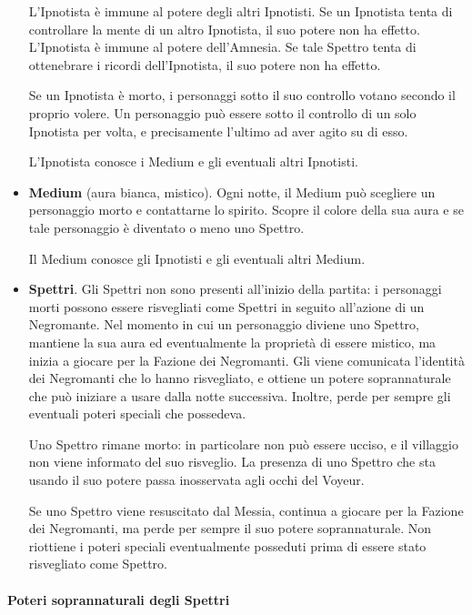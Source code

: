 \documentclass[a4paper,10pt]{article}
\begin{document}
\begin{itemize}
 L'Ipnotista è immune al potere degli altri Ipnotisti. Se un Ipnotista tenta di
controllare la mente di un altro Ipnotista, il suo potere non ha effetto.
 L'Ipnotista è immune al potere dell'Amnesia. Se tale Spettro tenta di
ottenebrare i ricordi dell'Ipnotista, il suo potere non ha effetto.

 Se un Ipnotista è morto, i personaggi sotto il suo controllo votano secondo il
proprio volere.
 Un personaggio può essere sotto il controllo di un solo Ipnotista per volta, e
precisamente l'ultimo ad aver agito su di esso.

 L'Ipnotista conosce i Medium e gli eventuali altri Ipnotisti.

 \item {\bf Medium} (aura bianca, mistico). Ogni notte, il Medium può scegliere
un personaggio morto e contattarne lo spirito. Scopre il colore della sua aura e
se tale personaggio è diventato o meno uno Spettro.

 Il Medium conosce gli Ipnotisti e gli eventuali altri Medium.

 \item {\bf Spettri}. Gli Spettri non sono presenti all'inizio della partita: i
personaggi morti possono essere risvegliati come Spettri in seguito all'azione
di un Negromante.
Nel momento in cui un personaggio diviene uno Spettro, mantiene la sua aura ed
eventualmente la proprietà di essere mistico, ma inizia a giocare per la
Fazione dei Negromanti. Gli viene comunicata l'identità dei Negromanti che lo
hanno risvegliato, e ottiene un potere soprannaturale che può iniziare a usare
dalla notte successiva. Inoltre, perde per sempre gli eventuali poteri speciali
che possedeva.
 
 Uno Spettro rimane morto: in particolare non può essere ucciso, e il villaggio
non viene informato del suo risveglio.
 La presenza di uno Spettro che sta usando il suo potere passa inosservata agli
occhi del Voyeur.
 
 Se uno Spettro viene resuscitato dal Messia, continua a giocare per la Fazione
dei Negromanti, ma perde per sempre il suo potere soprannaturale. Non riottiene i poteri speciali eventualmente
posseduti prima di essere stato risvegliato come Spettro.
 
\end{itemize}


\paragraph{Poteri soprannaturali degli Spettri}
\end{document}
